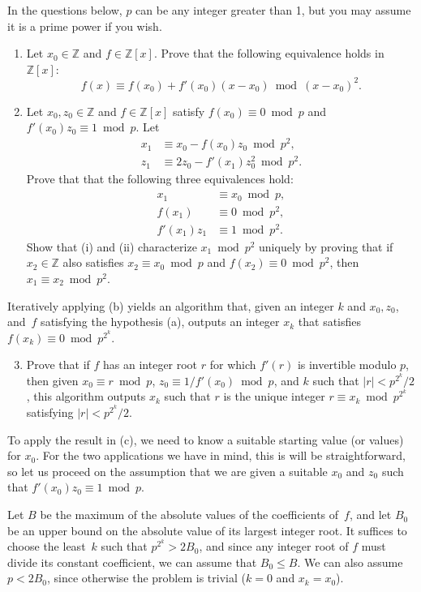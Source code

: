 \documentclass[11pt]{article}
\newcommand{\Z}{\mathbb{Z}}
\begin{document}
In the questions below, $p$ can be any integer greater than 1, but you may assume it is a prime power if you wish.

\begin{enumerate}[{\bf (a)}]
\item Let $x_0\in\Z$ and $f\in\Z[x]$.  Prove that the following equivalence holds in $\Z[x]$:
\[
f(x) \equiv f(x_0) + f'(x_0)(x-x_0)\bmod (x-x_0)^2.
\]
\item
Let $x_0,z_0\in\Z$ and $f\in\Z[x]$ satisfy $f(x_0)\equiv 0\bmod p$ and $f'(x_0)z_0\equiv 1\bmod p$.
Let
\begin{align*}
x_1 &\equiv x_0-f(x_0)z_0 \bmod p^2,\\
z_1 &\equiv 2z_0-f'(x_1)z_0^2\bmod p^2.
\end{align*}
Prove that that the following three equivalences hold:
\begin{align}
x_1&\equiv x_0\bmod p,\tag{i}\\
f(x_1)&\equiv 0\bmod p^2,\tag{ii}\\
f'(x_1)z_1&\equiv 1\bmod p^2.\tag{iii}
\end{align}
Show that (i) and (ii) characterize $x_1\bmod p^2$ uniquely by proving that if $x_2\in\Z$ also satisfies $x_2\equiv x_0\bmod p$ and $f(x_2)\equiv 0\bmod p^2$, then $x_1\equiv x_2\bmod p^2$.
\end{enumerate}

\noindent
Iteratively applying (b) yields an algorithm that, given an integer $k$ and $x_0,z_0$, and~$f$ satisfying the hypothesis (a), outputs an integer $x_k$ that satisfies $f(x_k)\equiv 0\bmod p^{2^k}$.

\begin{enumerate}[{\bf (a)}]
\setcounter{enumi}{2}
\item
Prove that if $f$ has an integer root $r$ for which $f'(r)$ is invertible modulo $p$, then given $x_0\equiv r\bmod p$, $z_0\equiv 1/f'(x_0)\bmod p$, and $k$ such that $|r| < p^{2^k}/2$, this algorithm outputs $x_k$ such that $r$ is the unique integer $r\equiv x_k \bmod p^{2^k}$ satisfying $|r| < p^{2^k}/2$.
\end{enumerate}

\noindent
To apply the result in (c), we need to know a suitable starting value (or values) for $x_0$.  For the two applications we have in mind, this is will be straightforward, so let us proceed on the assumption that we are given a suitable $x_0$ and $z_0$ such that $f'(x_0)z_0\equiv 1\bmod p$.

Let $B$ be the maximum of the absolute values of the coefficients of~$f$, and let $B_0$ be an upper bound on the absolute value of its largest integer root.  It suffices to choose the least~$k$ such that $p^{2^k} > 2B_0$, and since any integer root of $f$ must divide its constant coefficient, we can assume that $B_0\le B$.
We can also assume $p < 2B_0$, since otherwise the problem is trivial ($k=0$ and $x_k=x_0$).
\end{document}
